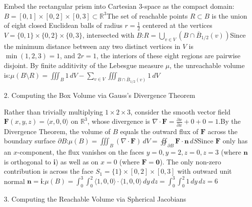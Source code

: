 \begin{enumerate}
 Embed the rectangular prism into Cartesian 3-space as the compact domain:\(B=[0,1]\times [0,2]\times [0,3]\subset \mathbb{R}^{3}\)The set of reachable points \(R \subset B\) is the union of eight closed Euclidean balls of radius \(r = \frac{1}{2}\) centered at the vertices \(V = \{0,1\} \times \{0,2\} \times \{0,3\}\), intersected with \(B\):\(R=\bigcup _{v\in V}\left(B\cap \overline{B}_{1/2}(v)\right)\)Since the minimum distance between any two distinct vertices in \(V\) is \(\min(1, 2, 3) = 1\), and \(2r = 1\), the interiors of these eight regions are pairwise disjoint. By finite additivity of the Lebesgue measure \(\mu \), the unreachable volume is:\(\mu (B\setminus R)=\iiint _{B}1\,dV-\sum _{v\in V}\iiint _{B\cap \overline{B}_{1/2}(v)}1\,dV\)

 2. Computing the Box Volume via Gauss's Divergence Theorem

 Rather than trivially multiplying \(1 \times 2 \times 3\), consider the smooth vector field \(\mathbf{F}(x, y, z) = \langle x, 0, 0 \rangle\) on \(\mathbb{R}^{3}\), whose divergence is \(\nabla \cdot \mathbf{F} = \frac{\partial x}{\partial x} + 0 + 0 = 1\).By the Divergence Theorem, the volume of \(B\) equals the outward flux of \(\mathbf{F}\) across the boundary surface \(\partial B\):\(\mu (B)=\iiint _{B}(\nabla \cdot \mathbf{F})\,dV=\oiint _{\partial B}\mathbf{F}\cdot \mathbf{n}\,dS\)Since \(\mathbf{F}\) only has an \(x\)-component, the flux vanishes on the faces \(y=0, y=2, z=0, z=3\) (where \(\mathbf{n}\) is orthogonal to \(\mathbf{i}\)) as well as on \(x=0\) (where \(\mathbf{F} = \mathbf{0}\)). The only non-zero contribution is across the face \(S_1 = \{1\} \times [0,2] \times [0,3]\) with outward unit normal \(\mathbf{n} = \mathbf{i}\):\(\mu (B)=\int _{0}^{3}\int _{0}^{2}\langle 1,0,0\rangle \cdot \langle 1,0,0\rangle \,dy\,dz=\int _{0}^{3}\int _{0}^{2}1\,dy\,dz=6\)

 3. Computing the Reachable Volume via Spherical Jacobians


\end{enumerate}
